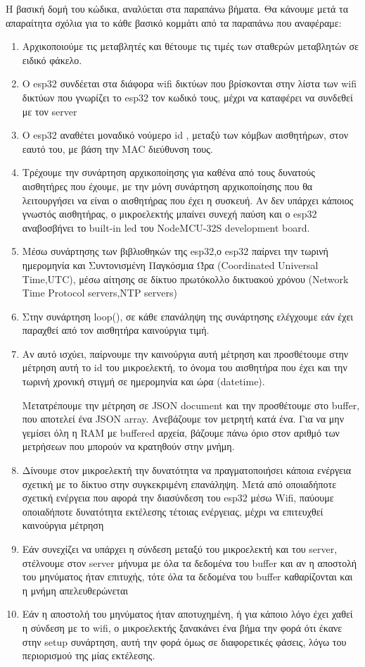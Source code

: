 Η βασική δομή του κώδικα, αναλύεται στα παραπάνω βήματα. Θα κάνουμε μετά τα απαραίτητα σχόλια για το κάθε βασικό κομμάτι από τα παραπάνω που αναφέραμε:
\begin{enumerate}
    \item  Αρχικοποιούμε τις μεταβλητές και θέτουμε τις τιμές των σταθερών μεταβλητών σε ειδικό φάκελο.
    
    \item Ο esp32 συνδέεται στα διάφορα wifi δικτύων που βρίσκονται στην λίστα των wifi δικτύων που γνωρίζει το esp32 τον κωδικό τους,
     μέχρι να καταφέρει να συνδεθεί με τον server 
    \item Ο esp32 αναθέτει μοναδικό νούμερο id , μεταξύ των κόμβων αισθητήρων, στον εαυτό του, με βάση την MAC διεύθυνση τους.
    \item Τρέχουμε την συνάρτηση αρχικοποίησης για καθένα από τους δυνατούς αισθητήρες που έχουμε,
    με την μόνη συνάρτηση αρχικοποίησης που θα λειτουργήσει να είναι ο αισθητήρας που έχει η συσκευή.
    Αν δεν υπάρχει κάποιος γνωστός αισθητήρας, ο μικροελεκτής μπαίνει συνεχή παύση και ο esp32 αναβοσβήνει το built-in led του NodeMCU-32S development board.
    \item Μέσω συνάρτησης των βιβλιοθηκών της esp32,ο esp32 παίρνει την τωρινή ημερομηνία και Συντονισμένη Παγκόσμια Ώρα (Coordinated Universal Time,UTC), 
    μέσω αίτησης σε δίκτυο πρωτόκολλο δικτυακού χρόνου (Network Time Protocol servers,NTP servers)
    \item Στην συνάρτηση loop(), σε κάθε επανάληψη της συνάρτησης ελέγχουμε εάν έχει παραχθεί από τον αισθητήρα καινούργια τιμή.
    \item Aν αυτό ισχύει, παίρνουμε την καινούργια αυτή μέτρηση και προσθέτουμε στην μέτρηση αυτή το id του μικροελεκτή,
    το όνομα του αισθητήρα που έχει και την τωρινή χρονική στιγμή σε ημερομηνία και ώρα (datetime). 
    
    Μετατρέπουμε την μέτρηση σε JSON document και την προσθέτουμε στο buffer,
    που αποτελεί ένα JSON array. Ανεβάζουμε τον μετρητή κατά ένα. Για να μην γεμίσει όλη η RAM με buffered αρχεία, 
    βάζουμε πάνω όριο στον αριθμό των μετρήσεων που μπορούν να κρατηθούν στην μνήμη.
   \item Δίνουμε στον μικροελεκτή την δυνατότητα να πραγματοποιήσει κάποια ενέργεια σχετική με το δίκτυο στην συγκεκριμένη επανάληψη.
    Μετά από οποιαδήποτε σχετική ενέργεια που αφορά την διασύνδεση του esp32 μέσω Wifi, παύουμε οποιαδήποτε δυνατότητα εκτέλεσης τέτοιας ενέργειας, 
    μέχρι να επιτευχθεί καινούργια μέτρηση
    \item Εάν συνεχίζει να υπάρχει η σύνδεση μεταξύ του μικροελεκτή και του server, στέλνουμε στον server μήνυμα με όλα τα δεδομένα του buffer 
    και αν η αποστολή του μηνύματος ήταν επιτυχής, τότε όλα τα δεδομένα του buffer καθαρίζονται και η μνήμη απελευθερώνεται 
    \item Εάν η αποστολή του μηνύματος ήταν αποτυχημένη, ή για κάποιο λόγο έχει χαθεί η σύνδεση με το wifi,
    ο μικροελεκτής ξανακάνει ένα βήμα την φορά ότι έκανε στην setup συνάρτηση, αυτή την φορά όμως σε διαφορετικές φάσεις, λόγω του περιορισμού της μίας εκτέλεσης.
\end{enumerate}   

